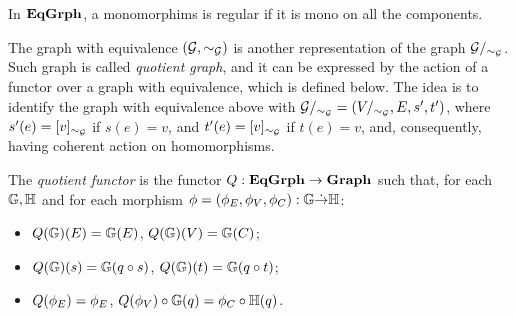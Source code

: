 \begin{prop}\label{prop:reg_monos_in_EqGrph}
    In $\mathbf{EqGrph}$, a monomorphims is regular if it is mono on all the components.
\end{prop}


The graph with equivalence $(\mathcal{G}, \sim_{\mathcal{G}})$ is another representation of the graph $\mathcal{G}/_{\sim_{\mathcal{G}}}$. Such graph is called \emph{quotient graph}, and it can be expressed by the action of a functor over a graph with equivalence, which is defined below. The idea is to identify the graph with equivalence  above with $\mathcal{G}/_{\sim_{\mathcal{G}}} = (V/_{\sim_{\mathcal{G}}}, E, s', t')$, where $s'(e) = [v]_{\sim_{\mathcal{G}}}$ if $s(e) = v$, and $t'(e) = [v]_{\sim_{\mathcal{G}}}$ if $t(e) = v$, and, consequently, having coherent action on homomorphisms.


\begin{definition}\label{def:quot_func}
    The \emph{quotient functor} is the functor $Q: \mathbf{EqGrph} \rightarrow \mathbf{Graph}$ such that, for each $\mathbb{G, H}$ and for each morphism $\phi = (\phi_E, \phi_V, \phi_C) : \mathbb{G \dot\to H}$:
    \begin{itemize}
        \item $Q(\mathbb{G})(E) = \mathbb{G}(E)$, $Q(\mathbb{G})(V) = \mathbb{G}(C)$;
        \item $Q(\mathbb{G})(s) = \mathbb{G}(q \circ s)$, $Q(\mathbb{G})(t) = \mathbb{G}(q \circ t)$;
        \item $Q(\phi_E) = \phi_E$, $Q(\phi_V) \circ \mathbb{G}(q) = \phi_C \circ \mathbb{H}(q) $.
    \end{itemize}
\end{definition}

